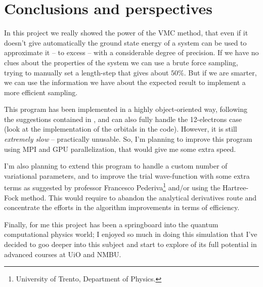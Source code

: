 
\chapter{Conclusions and perspectives}
In this project we really showed the power of the VMC method, that even if it doesn't give automatically the ground state energy of a system can be used to approximate it -- to excess -- with a considerable degree of precision. If we have no clues about the properties of the system we can use a brute force sampling, trying to manually set a length-step that gives about $50\%$. But if we are smarter, we can use the information we have about the expected result to implement a more efficient sampling.

This program has been implemented in a highly object-oriented way, following the suggestions contained in \cite{Hoegberget2013}, and can also fully handle the 12-electrons case (look at the implementation of the orbitals in the code). However, it is still \emph{extremely slow} -- practically unusable. So, I'm planning to improve this program using MPI and GPU parallelization, that would give me some extra speed.

I'm also planning to extend this program to handle a custom number of variational parameters, and to improve the trial wave-function with some extra terms as suggested by professor Francesco Pederiva\footnote{University of Trento, Department of Physics.} and/or using the Hartree-Fock method. This would require to abandon the analytical derivatives route and concentrate the efforts in the algorithm improvements in terms of efficiency.

Finally, for me this project has been a springboard into the quantum computational physics world; I enjoyed so much in doing this simulation that I've decided to goo deeper into this subject and start to explore of its full potential in advanced courses at UiO and NMBU.